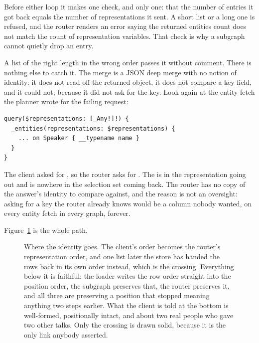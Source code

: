 %
Before either loop it makes one check, and only one: that the number of entries
it got back equals the number of representations it sent. A short list or a
long one is refused, and the router renders an error saying the returned
entities count does not match the count of representation variables. That
check is why a subgraph cannot quietly drop an entry.

%
A list of the right length in the wrong order passes it without comment. There
is nothing else to catch it. The merge is a JSON deep merge with no notion of
identity: it does not read  off the returned object, it does
not compare a key field, and it could not, because it did not ask for the key.
Look again at the entity fetch the planner wrote for the failing request:

\begin{verbatim}
query($representations: [_Any!]!) {
  _entities(representations: $representations) {
    ... on Speaker { __typename name }
  }
}
\end{verbatim}

%
The client asked for , so the router asks for . The
 is in the representation going out and is nowhere in the selection
set coming back. The router has no copy of the answer's identity to compare
against, and the reason is not an oversight: asking for a key the router
already knows would be a column nobody wanted, on every entity fetch in every
graph, forever.

Figure~\ref{fig:ch11-position-is-the-join} is the whole path.

\begin{figure}[htbp]
  \centering
  
  \caption{Where the identity goes. The client's order becomes the router's
  representation order, and one  list later the store has handed the
  rows back in its own order instead, which is the crossing. Everything below
  it is faithful: the loader writes the row order straight into the position
  order, the subgraph preserves that, the router preserves it, and all three
  are preserving a position that stopped meaning anything two steps earlier.
  What the client is told at the bottom is well-formed, positionally intact,
  and about two real people who gave two other talks. Only the crossing is
  drawn solid, because it is the only link anybody asserted.}
  \label{fig:ch11-position-is-the-join}
\end{figure}

